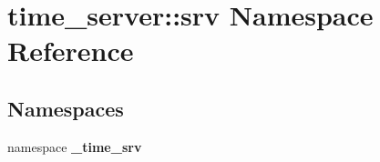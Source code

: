 \section{time\-\_\-server\-:\-:srv \-Namespace \-Reference}
\label{namespacetime__server_1_1srv}
\subsection*{\-Namespaces}
\begin{DoxyCompactItemize}
\item 
namespace {\bf \-\_\-time\-\_\-srv}
\end{DoxyCompactItemize}
